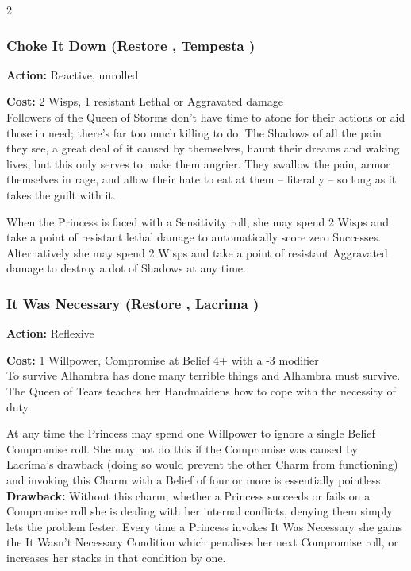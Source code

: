 \begin{multicols}{2}
\subsubsection*{Choke It Down (Restore \textbullet\textbullet\textbullet, Tempesta \textbullet\textbullet)}

\noindent \textbf{Action:} Reactive, unrolled

\noindent \textbf{Cost:} 2 Wisps, 1 resistant Lethal or Aggravated damage \\

\noindent Followers of the Queen of Storms don't have time to atone for their actions or aid those in need; there's far too much killing to do. The Shadows of all the pain they see, a great deal of it caused by themselves, haunt their dreams and waking lives, but this only serves to make them angrier. They swallow the pain, armor themselves in rage, and allow their hate to eat at them -- literally -- so long as it takes the guilt with it.

When the Princess is faced with a Sensitivity roll, she may spend 2 Wisps and take a point of resistant lethal damage to automatically score zero Successes. Alternatively she may spend 2 Wisps and take a point of resistant Aggravated damage to destroy a dot of Shadows at any time.

\subsubsection*{It Was Necessary (Restore \textbullet\textbullet\textbullet, Lacrima \textbullet\textbullet\textbullet\textbullet)}

\noindent \textbf{Action:} Reflexive

\noindent \textbf{Cost:} 1 Willpower, Compromise at Belief 4+ with a -3 modifier\\

\noindent To survive Alhambra has done many terrible things and Alhambra must survive. The Queen of Tears teaches her Handmaidens how to cope with the necessity of duty. 

At any time the Princess may spend one Willpower to ignore a single Belief Compromise roll. She may not do this if the Compromise was caused by Lacrima's drawback (doing so would prevent the other Charm from functioning) and invoking this Charm with a Belief of four or more is essentially pointless.\\

\noindent \textbf{Drawback:} Without this charm, whether a Princess succeeds or fails on a Compromise roll she is dealing with her internal conflicts, denying them simply lets the problem fester. Every time a Princess invokes It Was Necessary she gains the It Wasn't Necessary Condition which penalises her next Compromise roll, or increases her stacks in that condition by one. 


\end{multicols}
